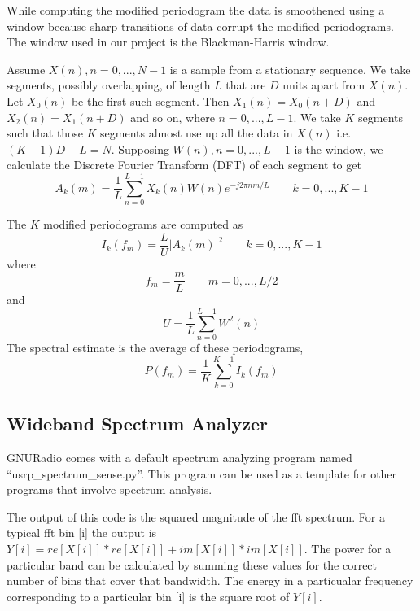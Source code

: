 While computing the modified periodogram the data is smoothened using a window
because sharp transitions of data corrupt the modified periodograms. The 
window used in our project is the Blackman-Harris window.

Assume $X(n), n=0, ..., N-1$ is a sample from a stationary sequence. We take
segments, possibly overlapping, of length $L$ that are $D$ units apart from 
$X(n)$. Let $X_0(n)$ be the first such segment. Then $X_1(n) = X_0(n+D)$ and
$X_2(n) = X_1(n+D)$ and so on, where $n=0, ..., L-1$. We take $K$ segments
such that those $K$ segments almost use up all the data in $X(n)$ i.e.
$ (K-1)D + L = N$. Supposing $W(n), n=0, ..., L-1$ is the window, we calculate
the Discrete Fourier Transform (DFT) of each segment to get
\begin{equation*}
    A_k(m) = \frac{1}{L}\sum_{n=0}^{L-1}X_k(n)W(n)e^{-j2\pi nm/L} \qquad
    k = 0, ..., K-1
\end{equation*}

The $K$ modified periodograms are computed as 
\begin{equation*}
    I_k(f_m) = \frac{L}{U}\left|A_k(m)\right|^2 \qquad k = 0, ..., K-1
\end{equation*}
where
\begin{equation*}
    f_m = \frac{m}{L} \qquad m = 0, ..., L/2
\end{equation*}
and
\begin{equation*}
    U = \frac{1}{L}\sum_{n=0}^{L-1}W^2(n)
\end{equation*}
The spectral estimate is the average of these periodograms,
\begin{equation*}
    P(f_m) = \frac{1}{K}\sum_{k=0}^{K-1}I_k(f_m)
\end{equation*}

\subsection{Wideband Spectrum Analyzer}

GNURadio comes with a default spectrum analyzing program named 
``usrp\_spectrum\_sense.py''. This program can be used as a template for other
programs that involve spectrum analysis.

The output of this code is the squared magnitude of the \gls{fft}  spectrum. For a 
typical \gls{fft}  bin [i] the output is 
$Y[i] = re[X[i]]*re[X[i]] + im[X[i]]*im[X[i]]$. The power for a particular 
band can be calculated by summing these values for the correct number of bins
that cover that bandwidth. The energy in a particualar frequency corresponding
to a particular bin [i] is the square root of $Y[i]$. 

